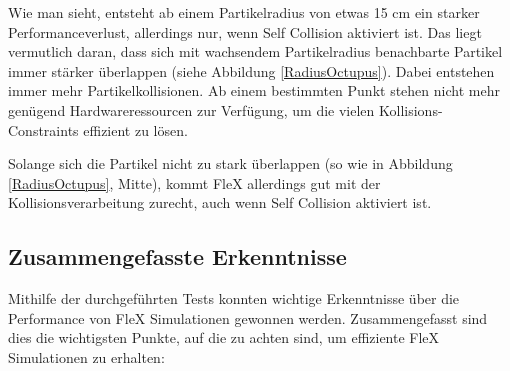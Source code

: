 Wie man sieht, entsteht ab einem Partikelradius von etwas 15 cm ein starker Performanceverlust, allerdings nur, wenn Self Collision aktiviert ist. Das liegt vermutlich daran, dass sich mit wachsendem Partikelradius benachbarte Partikel immer stärker überlappen (siehe Abbildung \ref{RadiusOctupus}). Dabei entstehen immer mehr Partikelkollisionen. Ab einem bestimmten Punkt stehen nicht mehr genügend Hardwareressourcen zur Verfügung, um die vielen Kollisions-Constraints effizient zu lösen.

Solange sich die Partikel nicht zu stark überlappen (so wie in Abbildung \ref{RadiusOctupus}, Mitte), kommt FleX allerdings gut mit der Kollisionsverarbeitung zurecht, auch wenn Self Collision aktiviert ist.

\subsection{Zusammengefasste Erkenntnisse}
\label{subsec_perf_zusa}

Mithilfe der durchgeführten Tests konnten wichtige Erkenntnisse über die Performance von FleX Simulationen gewonnen werden. Zusammengefasst sind dies die wichtigsten Punkte, auf die zu achten sind, um effiziente FleX Simulationen zu erhalten:

